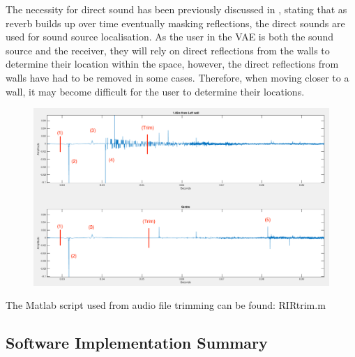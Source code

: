 \documentclass[../../main.tex]{subfiles}
\begin{document}
		The necessity for direct sound has been previously discussed in \cite{Devore2009}, stating that as reverb builds up over time eventually masking reflections, the direct sounds are used for sound source localisation. As the user in the \ac{VAE} is both the sound source and the receiver, they will rely on direct reflections from the walls to determine their location within the space, however, the direct reflections from walls have had to be removed in some cases. Therefore, when moving closer to a wall, it may become difficult for the user to determine their locations.

		\begin{figure}[H]
			\centerline{\includegraphics[scale = 0.4]{Sections/Implementation/Max/images/Latency/odeonLatency_edit.png}}
			\caption{}
			\label{odeonTrim}
		\end{figure}

		The Matlab script used from audio file trimming can be found: RIRtrim.m


		


	\subsection{Software Implementation Summary}
\end{document}
